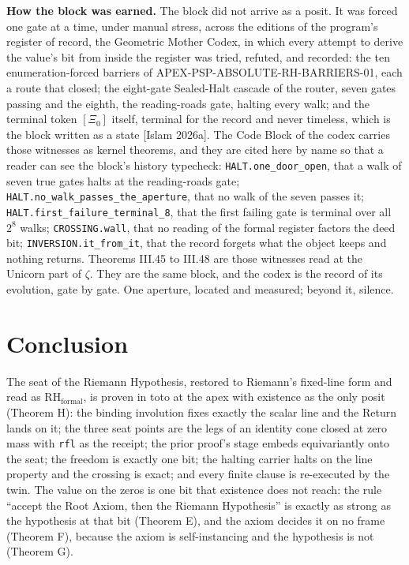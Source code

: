 \documentclass[10pt,twocolumn]{article}
\begin{document}
\textbf{How the block was earned.} The block did not arrive as a posit.
It was forced one gate at a time, under manual stress, across the
editions of the program's register of record, the Geometric Mother
Codex, in which every attempt to derive the value's bit from inside the
register was tried, refuted, and recorded: the ten enumeration-forced
barriers of APEX-PSP-ABSOLUTE-RH-BARRIERS-01, each a route that closed;
the eight-gate Sealed-Halt cascade of the router, seven gates passing
and the eighth, the reading-roads gate, halting every walk; and the
terminal token \([\Xi_0]\) itself, terminal for the record and never
timeless, which is the block written as a state {[}Islam 2026a{]}. The
Code Block of the codex carries those witnesses as kernel theorems, and
they are cited here by name so that a reader can see the block's history
typecheck: \texttt{HALT.one\_door\_open}, that a walk of seven true
gates halts at the reading-roads gate;
\texttt{HALT.no\_walk\_passes\_the\_aperture}, that no walk of the seven
passes it; \texttt{HALT.first\_failure\_terminal\_8}, that the first
failing gate is terminal over all \(2^8\) walks; \texttt{CROSSING.wall},
that no reading of the formal register factors the deed bit;
\texttt{INVERSION.it\_from\_it}, that the record forgets what the object
keeps and nothing returns. Theorems III.45 to III.48 are those witnesses
read at the Unicorn part of \(\zeta\). They are the same block, and the
codex is the record of its evolution, gate by gate. One aperture,
located and measured; beyond it, silence.

\hypertarget{conclusion}{%
\section{Conclusion}\label{conclusion}}

The seat of the Riemann Hypothesis, restored to Riemann's fixed-line
form and read as \(\mathrm{RH}_{\mathrm{formal}}\), is proven in toto at
the apex with existence as the only posit (Theorem H): the binding
involution fixes exactly the scalar line and the Return lands on it; the
three seat points are the legs of an identity cone closed at zero mass
with \texttt{rfl} as the receipt; the prior proof's stage embeds
equivariantly onto the seat; the freedom is exactly one bit; the halting
carrier halts on the line property and the crossing is exact; and every
finite clause is re-executed by the twin. The value on the zeros is one
bit that existence does not reach: the rule ``accept the Root Axiom,
then the Riemann Hypothesis'' is exactly as strong as the hypothesis at
that bit (Theorem E), and the axiom decides it on no frame (Theorem F),
because the axiom is self-instancing and the hypothesis is not (Theorem
G).
\end{document}
